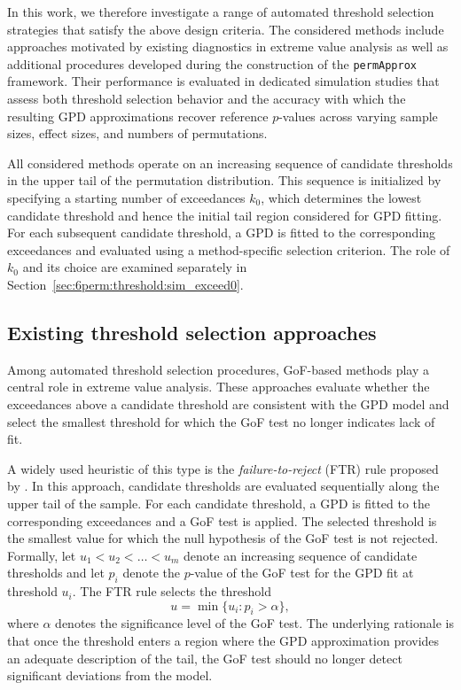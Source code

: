 In this work, we therefore investigate a range of automated threshold selection strategies that satisfy the above design criteria. The considered methods include approaches motivated by existing diagnostics in extreme value analysis as well as additional procedures developed during the construction of the \texttt{permApprox} framework. Their performance is evaluated in dedicated simulation studies that assess both threshold selection behavior and the accuracy with which the resulting GPD approximations recover reference $p$-values across varying sample sizes, effect sizes, and numbers of permutations.

All considered methods operate on an increasing sequence of candidate thresholds in the upper tail of the permutation distribution. This sequence is initialized by specifying a starting number of exceedances $k_0$, which determines the lowest candidate threshold and hence the initial tail region considered for GPD fitting. For each subsequent candidate threshold, a GPD is fitted to the corresponding exceedances and evaluated using a method-specific selection criterion. The role of $k_0$ and its choice are examined separately in Section~\ref{sec:6perm:threshold:sim_exceed0}.

\subsection{Existing threshold selection approaches}
\label{sec:6perm:threshold:existing}

Among automated threshold selection procedures, GoF-based methods play a central role in extreme value analysis. These approaches evaluate whether the exceedances above a candidate threshold are consistent with the GPD model and select the smallest threshold for which the GoF test no longer indicates lack of fit.

A widely used heuristic of this type is the \emph{failure-to-reject} (FTR) rule proposed by \citet{choulakian2001goodnessoffit}. In this approach, candidate thresholds are evaluated sequentially along the upper tail of the sample. For each candidate threshold, a GPD is fitted to the corresponding exceedances and a GoF test is applied. The selected threshold is the smallest value for which the null hypothesis of the GoF test is not rejected. 
Formally, let $u_1 < u_2 < \dots < u_m$ denote an increasing sequence of candidate thresholds and let $p_i$ denote the $p$-value of the GoF test for the GPD fit at threshold $u_i$. 
The FTR rule selects the threshold
\begin{equation}
u = \min \{ u_i : p_i > \alpha \},
\end{equation}
where $\alpha$ denotes the significance level of the GoF test.
The underlying rationale is that once the threshold enters a region where the GPD approximation provides an adequate description of the tail, the GoF test should no longer detect significant deviations from the model.

